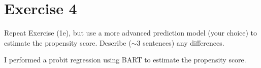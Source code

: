 
\section{Exercise 4}

\begin{quoting}
  Repeat Exercise (1e), but use a more advanced prediction model (your
  choice) to estimate the propensity score. Describe ($\sim$3
  sentences) any differences.
\end{quoting}

I performed a probit regression using BART \citep{chipman2010} to
estimate the propensity score.

